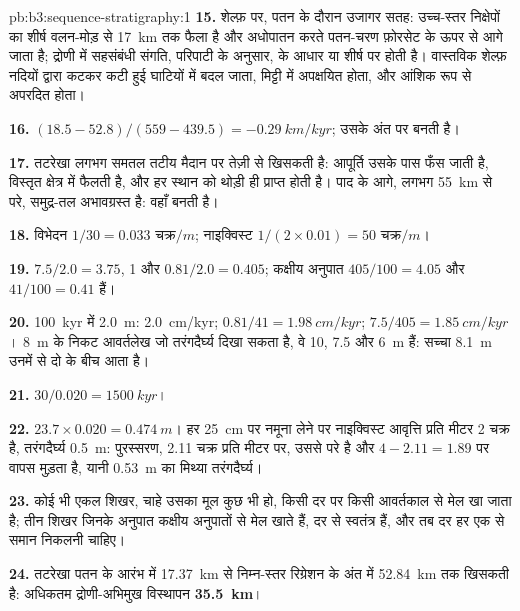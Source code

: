 \begin{solution}{pb:b3:sequence-stratigraphy:1}
\textbf{15.} शेल्फ़ पर, पतन के दौरान उजागर सतह: उच्च-स्तर निक्षेपों का शीर्ष
वलन-मोड़ से \qty{17}{km} तक फैला है और अधोपातन करते पतन-चरण फ़ोरसेट के
ऊपर से आगे जाता है; द्रोणी में सहसंबंधी
संगति, परिपाटी के अनुसार,  के आधार या शीर्ष पर होती है। वास्तविक
शेल्फ़ नदियों द्वारा कटकर कटी हुई घाटियों में बदल जाता, मिट्टी में अपक्षयित होता,
और आंशिक रूप से अपरदित होता।

\textbf{16.} $(18.5 - 52.8)/(559 - 439.5) = \qty{-0.29}{km/kyr}$;  उसके अंत पर बनती है।

\textbf{17.} तटरेखा लगभग समतल तटीय मैदान पर तेज़ी से खिसकती है:
आपूर्ति उसके पास फँस जाती है, विस्तृत क्षेत्र में फैलती है, और हर स्थान
को थोड़ी ही प्राप्त होती है। पाद के आगे, लगभग \qty{55}{km} से परे, समुद्र-तल
अभावग्रस्त है: वहाँ  बनती है।

\textbf{18.} विभेदन $1/30 = \num{0.033}\text{ चक्र}/\unit{m}$; नाइक्विस्ट $1/(2\times
0.01) = \num{50}\text{ चक्र}/\unit{m}$।

\textbf{19.} $7.5/2.0 = 3.75$, 1 और $0.81/2.0 = 0.405$; कक्षीय अनुपात
$405/100 = 4.05$ और $41/100 = 0.41$ हैं।

\textbf{20.} \qty{100}{kyr} में \qty{2.0}{m}: \qty{2.0}{cm/kyr}; $0.81/41 =
\qty{1.98}{cm/kyr}$; $7.5/405 = \qty{1.85}{cm/kyr}$। \qty{8}{m} के निकट
आवर्तलेख जो तरंगदैर्घ्य दिखा सकता है, वे 10, 7.5 और \qty{6}{m} हैं: सच्चा
\qty{8.1}{m} उनमें से दो के बीच आता है।

\textbf{21.} $30/0.020 = \qty{1500}{kyr}$।

\textbf{22.} $23.7\times0.020 = \qty{0.474}{m}$। हर
\qty{25}{cm} पर नमूना लेने पर नाइक्विस्ट आवृत्ति प्रति मीटर 2 चक्र है, तरंगदैर्घ्य
\qty{0.5}{m}: पुरस्सरण, 2.11 चक्र प्रति मीटर पर, उससे परे है और
$4 - 2.11 = 1.89$ पर वापस मुड़ता है, यानी \qty{0.53}{m} का मिथ्या तरंगदैर्घ्य।

\textbf{23.} कोई भी एकल शिखर, चाहे उसका मूल कुछ भी हो, किसी दर पर किसी आवर्तकाल से
मेल खा जाता है; तीन शिखर जिनके अनुपात कक्षीय अनुपातों से मेल खाते हैं, दर से स्वतंत्र हैं,
और तब दर हर एक से समान निकलनी चाहिए।

\textbf{24.} तटरेखा पतन के आरंभ में \qty{17.37}{km} से
निम्न-स्तर रिग्रेशन के अंत में \qty{52.84}{km} तक खिसकती है: अधिकतम
द्रोणी-अभिमुख विस्थापन \textbf{\qty[text-series-to-math=true]{35.5}{km}}।
\end{solution}
